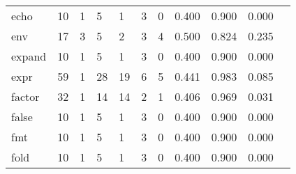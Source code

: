 \begin{longtable}{lp{1.10cm}p{1.10cm}p{1.10cm}p{1.10cm}p{1.10cm}p{1.10cm}p{1.10cm}p{1.10cm}p{1.10cm}p{1.10cm}}
echo      &                     10 &                                  1 &                                 5 &                                1 &                                 3 &                               0 &                          0.400 &                                 0.900 &                               0.000 \\
env       &                     17 &                                  3 &                                 5 &                                2 &                                 3 &                               4 &                          0.500 &                                 0.824 &                               0.235 \\
expand    &                     10 &                                  1 &                                 5 &                                1 &                                 3 &                               0 &                          0.400 &                                 0.900 &                               0.000 \\
expr      &                     59 &                                  1 &                                28 &                               19 &                                 6 &                               5 &                          0.441 &                                 0.983 &                               0.085 \\
factor    &                     32 &                                  1 &                                14 &                               14 &                                 2 &                               1 &                          0.406 &                                 0.969 &                               0.031 \\
false     &                     10 &                                  1 &                                 5 &                                1 &                                 3 &                               0 &                          0.400 &                                 0.900 &                               0.000 \\
fmt       &                     10 &                                  1 &                                 5 &                                1 &                                 3 &                               0 &                          0.400 &                                 0.900 &                               0.000 \\
fold      &                     10 &                                  1 &                                 5 &                                1 &                                 3 &                               0 &                          0.400 &                                 0.900 &                               0.000 \\

\end{longtable}
